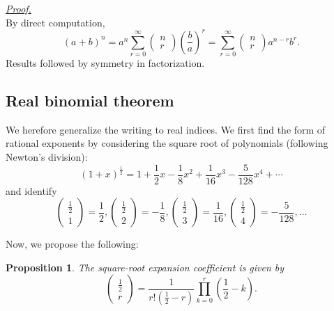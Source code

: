 \documentclass[12pt]{article}
\newtheorem*{proposition}{Proposition}
\renewenvironment{proof}[1][Proof]{\begin{snugshade*} \underline{\textit{{#1}.}}\\}{\hfill \qedsymbol \end{snugshade*}}
\begin{document}
    \begin{proof}
        By direct computation, \[(a+b)^n=a^n\sum_{r=0}^{\infty}\begin{pmatrix}
            n\\r
        \end{pmatrix}(\frac{b}{a})^r=\sum_{r=0}^{\infty}\begin{pmatrix}
            n\\r
        \end{pmatrix}a^{n-r}b^r.\]
        Results followed by symmetry in factorization.
    \end{proof}

    \subsection{Real binomial theorem}

    We herefore generalize the writing to real indices. We first find the form of rational exponents by considering the square root of polynomials (following Newton's division):\[(1+x)^{\frac{1}{2}}=1+\frac{1}{2}x-\frac{1}{8}x^2+\frac{1}{16}x^3-\frac{5}{128}x^4+\cdots\] and identify \[\begin{pmatrix}
        \frac{1}{2}\\1
    \end{pmatrix}=\frac{1}{2}, \begin{pmatrix}
        \frac{1}{2}\\2
    \end{pmatrix}=-\frac{1}{8}, \begin{pmatrix}
        \frac{1}{2}\\3
    \end{pmatrix}=\frac{1}{16}, \begin{pmatrix}
        \frac{1}{2}\\4
    \end{pmatrix}=-\frac{5}{128},\dots\]

    Now, we propose the following:

    \begin{proposition}
        The square-root expansion coefficient is given by \[\begin{pmatrix}
            \frac{1}{2}\\r
        \end{pmatrix}=\frac{1}{r!(\frac{1}{2}-r)}\prod_{k=0}^{r}(\frac{1}{2}-k).\] 
    \end{proposition}
\end{document}
